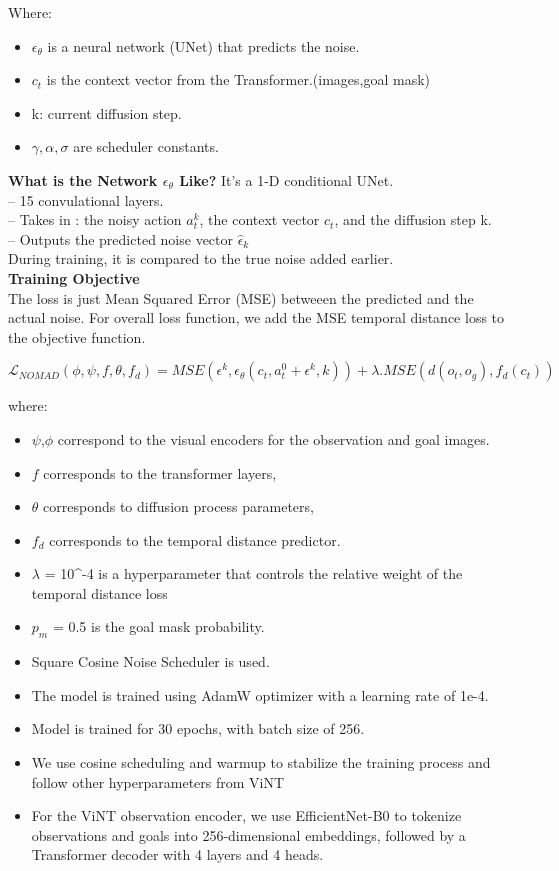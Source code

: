 \documentclass[12pt]{article}
\begin{document}
Where:
\begin{itemize}
    \item $\epsilon_{\theta}$ is a neural network (UNet) that predicts the noise.
    \item $c_t$ is the context vector from the Transformer.(images,goal mask)
    \item k: current diffusion step.
    \item $\gamma, \alpha ,\sigma$ are scheduler constants.
\end{itemize}
\textbf{What is the Network $\epsilon_{\theta}$ Like?}
It's a 1-D conditional UNet.\\
-- 15 convulational layers.\\
-- Takes in : the noisy action $a^{k}_t$, the context vector $c_t$, and the diffusion step k.\\
-- Outputs the predicted noise vector $\hat{\epsilon}_k$\\
During training, it is compared to the true noise added earlier.\\
\textbf{Training Objective}\\
The loss is just Mean Squared Error (MSE) betweeen the predicted and the actual noise. For overall loss function, we add the MSE temporal distance loss to the objective function.\\
\begin{center}
   \[ 
   \mathcal{L}_{NOMAD}(\phi,\psi,f,\theta,f_d) = MSE(\epsilon^{k}, \epsilon_{\theta}(c_t, a^{0}_t + \epsilon^{k},k)) + \lambda .MSE(d(o_t, o_g), f_{d}(c_t))
   \]
\end{center}
where:\\
\begin{itemize}
    \item $\psi$,$\phi$ correspond to the visual encoders for the observation and goal images.
    \item $f$ corresponds to the transformer layers,
    \item $\theta$ corresponds to diffusion process parameters,
    \item $f_d$ corresponds to the temporal distance predictor.
    \item $\lambda$ = 10^{-4} is a hyperparameter that controls the relative weight of the temporal distance loss
    \item $p_m$ = 0.5 is the goal mask probability.
    \item Square Cosine Noise Scheduler is used.
    \item The model is trained using AdamW optimizer with a learning rate of 1e-4.
    \item Model is trained for 30 epochs, with batch size of 256.
    \item We use cosine scheduling and warmup to stabilize the training process and follow other hyperparameters from ViNT 
    \item For the ViNT observation encoder, we use EfficientNet-B0 to tokenize observations and goals into 256-dimensional embeddings, followed by a Transformer decoder with 4 layers and 4 heads.
\end{itemize}
\end{document}

